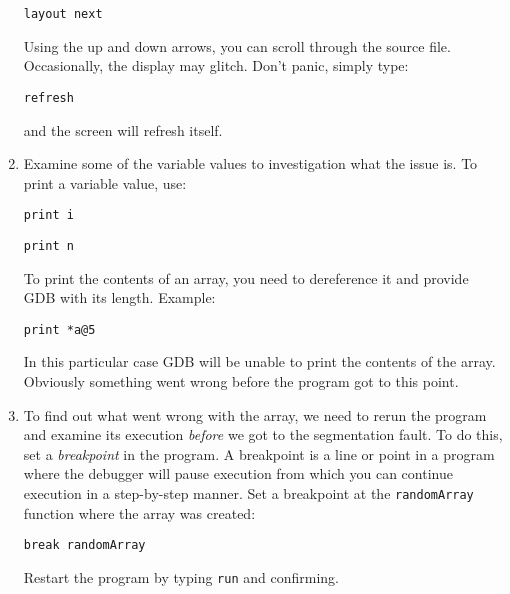\documentclass[12pt]{scrartcl}
\begin{document}
\begin{enumerate}
  \texttt{layout next}
  
  Using the up and down arrows, you can scroll through the source file.
  Occasionally, the display may glitch.  Don't panic, simply type:
  
  \texttt{refresh}
  
  and the screen will refresh itself.  
  
  \item Examine some of the variable values to investigation what the
  issue is.  To print a variable value, use:
  
  \texttt{print i}

  \texttt{print n}
  
  To print the contents of an array, you need to dereference it and 
  provide GDB with its length.  Example:
  
  \texttt{print *a@5}
  
  In this particular case GDB will be unable to print the contents of the
  array.  Obviously something went wrong before the program got to this point.
  
  \item To find out what went wrong with the array, we need to rerun
  the program and examine its execution \emph{before} we got to the
  segmentation fault.  To do this, set a \emph{breakpoint} in the program.
  A breakpoint is a line or point in a program where the debugger will 
  pause execution from which you can continue execution in a step-by-step
  manner.  Set a breakpoint at the \texttt{randomArray} function 
  where the array was created:
  
  \texttt{break randomArray}
  
  Restart the program by typing \texttt{run} and confirming.
  

\end{enumerate}
\end{document}
